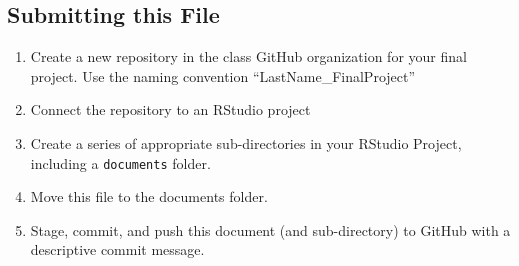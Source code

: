 \documentclass[
]{article}
\providecommand{\tightlist}{%
  \setlength{\itemsep}{0pt}\setlength{\parskip}{0pt}}
\begin{document}
\subsection{Submitting this File}\label{submitting-this-file}

\begin{enumerate}
\def\labelenumi{\arabic{enumi}.}
\tightlist
\item
  Create a new repository in the class GitHub organization for your
  final project. Use the naming convention ``LastName\_FinalProject''
\item
  Connect the repository to an RStudio project
\item
  Create a series of appropriate sub-directories in your RStudio
  Project, including a \texttt{documents} folder.
\item
  Move this file to the documents folder.
\item
  Stage, commit, and push this document (and sub-directory) to GitHub
  with a descriptive commit message.
\end{enumerate}
\end{document}

